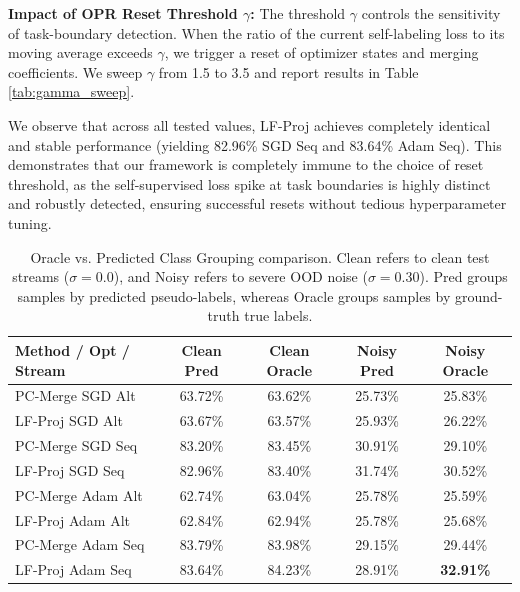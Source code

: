 \documentclass{article}
\theoremstyle{plain}
\theoremstyle{definition}
\theoremstyle{remark}
\begin{document}
\textbf{Impact of OPR Reset Threshold $\gamma$:} The threshold $\gamma$ controls the sensitivity of task-boundary detection. When the ratio of the current self-labeling loss to its moving average exceeds $\gamma$, we trigger a reset of optimizer states and merging coefficients. We sweep $\gamma$ from 1.5 to 3.5 and report results in Table \ref{tab:gamma_sweep}. 

We observe that across all tested values, LF-Proj achieves completely identical and stable performance (yielding 82.96\% SGD Seq and 83.64\% Adam Seq). This demonstrates that our framework is completely immune to the choice of reset threshold, as the self-supervised loss spike at task boundaries is highly distinct and robustly detected, ensuring successful resets without tedious hyperparameter tuning.

\begin{table}[h]
\caption{Oracle vs. Predicted Class Grouping comparison. Clean refers to clean test streams ($\sigma=0.0$), and Noisy refers to severe OOD noise ($\sigma = 0.30$). Pred groups samples by predicted pseudo-labels, whereas Oracle groups samples by ground-truth true labels.}
\label{tab:oracle_sweep}
\vskip 0.15in
\begin{center}
\begin{small}
\begin{sc}
\setlength{\tabcolsep}{4pt}
\begin{tabular}{lcccc}
\toprule
Method / Opt / Stream & Clean Pred & Clean Oracle & Noisy Pred & Noisy Oracle \\
\midrule
PC-Merge SGD Alt & 63.72\% & 63.62\% & 25.73\% & 25.83\% \\
LF-Proj SGD Alt & 63.67\% & 63.57\% & 25.93\% & 26.22\% \\
PC-Merge SGD Seq & 83.20\% & 83.45\% & 30.91\% & 29.10\% \\
LF-Proj SGD Seq & 82.96\% & 83.40\% & 31.74\% & 30.52\% \\
PC-Merge Adam Alt & 62.74\% & 63.04\% & 25.78\% & 25.59\% \\
LF-Proj Adam Alt & 62.84\% & 62.94\% & 25.78\% & 25.68\% \\
PC-Merge Adam Seq & 83.79\% & 83.98\% & 29.15\% & 29.44\% \\
LF-Proj Adam Seq & 83.64\% & 84.23\% & 28.91\% & \textbf{32.91\%} \\
\bottomrule
\end{tabular}
\end{sc}
\end{small}
\end{center}
\vskip -0.1in
\end{table}
\end{document}
